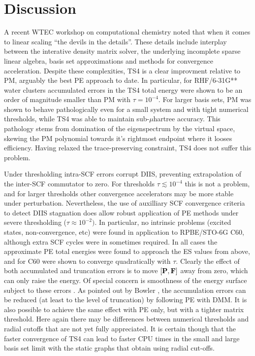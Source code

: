\commentoutA{\documentclass[prb,aps,twocolumn,twocolumngrid,secnumarabic,superbib,hyperref]{revtex4}}
\begin{document}
\section{Discussion}

A recent WTEC workshop on computational chemistry \cite{WTEC00} noted that when it comes
to linear scaling ``the devils in the details''. These details include
interplay between the interative density matrix solver, the underlying incomplete sparse 
linear algebra, basis set approximations and methods for convergence acceleration.   
Despite these complexities, TS4 is a clear improvment relative to PM, arguably the best 
PE approach to date.  
In particular,  for RHF/6-31G** water clusters accumulated errors in the TS4 total energy 
were shown to be an order of magnitude smaller than PM with $\tau=10^{-4}$.  
For larger basis sets, PM was shown to behave pathologically even 
for a small system and with tight numerical thresholds, while TS4 was able to maintain
sub-$\mu$hartree accuracy.  This pathology stems from domination of the eigenspectrum
by the virtual space, skewing the PM polynomial towards it's rightmost endpoint 
where it looses efficiency.   Having relaxed the trace-preserving constraint, TS4
does not suffer this problem.  

Under thresholding intra-SCF errors corrupt DIIS, preventing 
extrapolation of the inter-SCF commutator to zero.  For thresholds $\tau \lesssim 10^{-4}$
this is not a problem, and for larger thresholds other convergence 
accelerators may be more stable under perturbation.  Nevertheless,
the use of auxilliary SCF convergence criteria 
to detect DIIS stagnation does allow robust application of PE methods
under severe thresholding ($\tau \approx 10^{-2})$.
In particular, no intrinsic problems (excited states, non-convergence, etc) were
found in application to RPBE/STO-6G C60, although extra SCF cycles were in sometimes required. 
In all cases the approximate PE total energies were found to approach the ES values
from above, and for C60 were shown to converge quadratically with $\tau$.
Clearly the effect of both accumulated and truncation errors is to move 
$[\bf P,F]$ away from zero, which can only raise the energy.  Of special concern is smoothness
of the energy surface subject to these errors \cite{DBowler00}.  As pointed out by 
Bowler \cite{DBowler00},  the accumulation errors can be reduced 
(at least to the level of truncation) by following PE with DMM. 
It is also possible to achieve the same effect with PE only, but with a tighter matrix threshold.  
Here again there may be differences between numerical thresholds and radial cutoffs 
that are not yet fully appreciated. It is certain though that the faster convergence of TS4 can 
lead to faster CPU times in the small and large basis set limit with the static graphs 
that obtain using radial cut-offs.  
\end{document}
